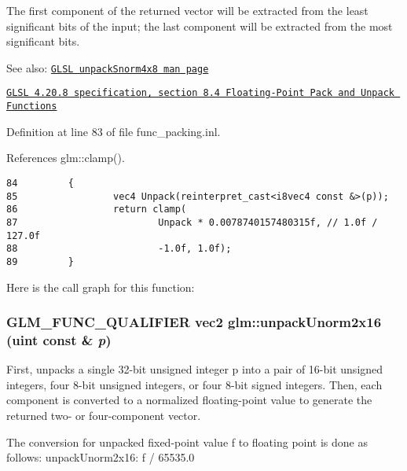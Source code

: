 The first component of the returned vector will be extracted from the least significant bits of the input; the last component will be extracted from the most significant bits.

\begin{Desc}
\item[See also:]\href{http://www.opengl.org/sdk/docs/manglsl/xhtml/unpackSnorm4x8.xml}{\tt GLSL unpackSnorm4x8 man page} 

\href{http://www.opengl.org/registry/doc/GLSLangSpec.4.20.8.pdf}{\tt GLSL 4.20.8 specification, section 8.4 Floating-Point Pack and Unpack Functions} \end{Desc}


Definition at line 83 of file func\_\-packing.inl.

References glm::clamp().

\begin{Code}\begin{verbatim}84         {
85                 vec4 Unpack(reinterpret_cast<i8vec4 const &>(p));
86                 return clamp(
87                         Unpack * 0.0078740157480315f, // 1.0f / 127.0f
88                         -1.0f, 1.0f);
89         }
\end{verbatim}
\end{Code}




Here is the call graph for this function:\hypertarget{group__core__func__packing_gff327a2fca8abfe31b74b914b68ac5ec}{
\subsubsection[unpackUnorm2x16]{\setlength{\rightskip}{0pt plus 5cm}GLM\_\-FUNC\_\-QUALIFIER vec2 glm::unpackUnorm2x16 (uint const \& {\em p})}}
\label{group__core__func__packing_gff327a2fca8abfe31b74b914b68ac5ec}


First, unpacks a single 32-bit unsigned integer p into a pair of 16-bit unsigned integers, four 8-bit unsigned integers, or four 8-bit signed integers. Then, each component is converted to a normalized floating-point value to generate the returned two- or four-component vector.

The conversion for unpacked fixed-point value f to floating point is done as follows: unpackUnorm2x16: f / 65535.0

